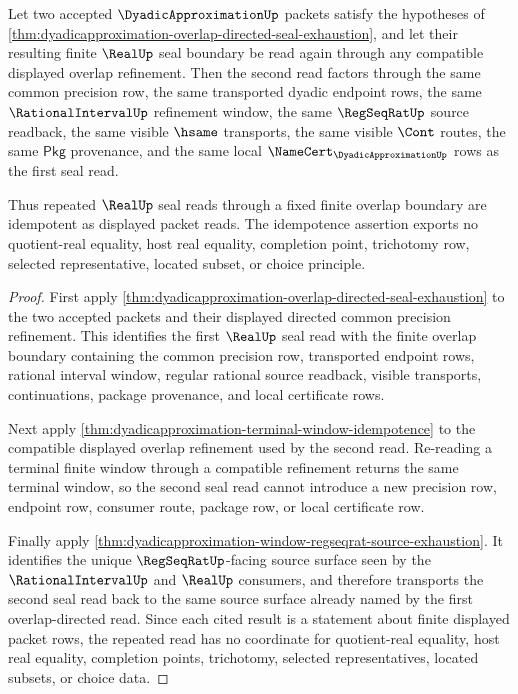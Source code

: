 \begin{theorem}\label{thm:dyadicapproximation-overlap-seal-idempotence}
Let two accepted $\DyadicApproximationUp$ packets satisfy the hypotheses of
\autoref{thm:dyadicapproximation-overlap-directed-seal-exhaustion}, and let
their resulting finite $\RealUp$ seal boundary be read again through any
compatible displayed overlap refinement. Then the second read factors through
the same common precision row, the same transported dyadic endpoint rows, the
same $\RationalIntervalUp$ refinement window, the same $\RegSeqRatUp$ source
readback, the same visible $\hsame$ transports, the same visible $\Cont$
routes, the same $\mathsf{Pkg}$ provenance, and the same local
$\NameCert_{\DyadicApproximationUp}$ rows as the first seal read.

Thus repeated $\RealUp$ seal reads through a fixed finite overlap boundary are
idempotent as displayed packet reads. The idempotence assertion exports no
quotient-real equality, host real equality, completion point, trichotomy row,
selected representative, located subset, or choice principle.
\end{theorem}
\begin{proof}
First apply
\autoref{thm:dyadicapproximation-overlap-directed-seal-exhaustion} to the two
accepted packets and their displayed directed common precision refinement. This
identifies the first $\RealUp$ seal read with the finite overlap boundary
containing the common precision row, transported endpoint rows, rational
interval window, regular rational source readback, visible transports,
continuations, package provenance, and local certificate rows.

Next apply \autoref{thm:dyadicapproximation-terminal-window-idempotence} to the
compatible displayed overlap refinement used by the second read. Re-reading a
terminal finite window through a compatible refinement returns the same terminal
window, so the second seal read cannot introduce a new precision row, endpoint
row, consumer route, package row, or local certificate row.

Finally apply
\autoref{thm:dyadicapproximation-window-regseqrat-source-exhaustion}. It
identifies the unique $\RegSeqRatUp$-facing source surface seen by the
$\RationalIntervalUp$ and $\RealUp$ consumers, and therefore transports the
second seal read back to the same source surface already named by the first
overlap-directed read. Since each cited result is a statement about finite
displayed packet rows, the repeated read has no coordinate for quotient-real
equality, host real equality, completion points, trichotomy, selected
representatives, located subsets, or choice data.
\end{proof}

